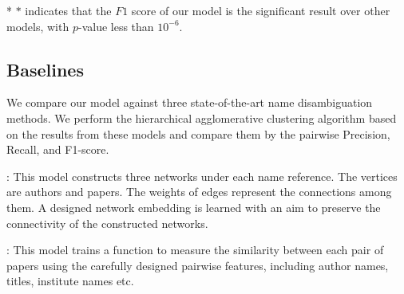 \documentclass[letterpaper]{article} %
\newcommand{\citet}[1]{{\citeauthor{#1} \shortcite{#1}}}
\begin{document}
\begin{table}[t]
\begin{center}
\caption{Results of author name disambiguation.}
\label{tb:allresult}
\footnotesize
{}
\begin{tablenotes}
\small \item[*] $*$ indicates that the $F1$ score of our model is the significant result over other models, with $p$-value less than $10^{-6}$.
\end{tablenotes}
\end{center}
\end{table}

\subsection{Baselines}
We compare our model against three state-of-the-art name disambiguation methods. We perform the hierarchical agglomerative clustering algorithm based on the results from these models and compare them by the pairwise Precision, Recall, and F1-score.

\textbf{\citet{Anonymized}}: This model constructs three networks under each name reference. The vertices are authors and papers. The weights of edges represent the connections among them. A designed network embedding is learned with an aim to preserve the connectivity of the constructed networks.

\textbf{\citet{Block}}: This model trains a function to measure the similarity between each pair of papers using the carefully designed pairwise features, including author names, titles, institute names etc.
\end{document}
